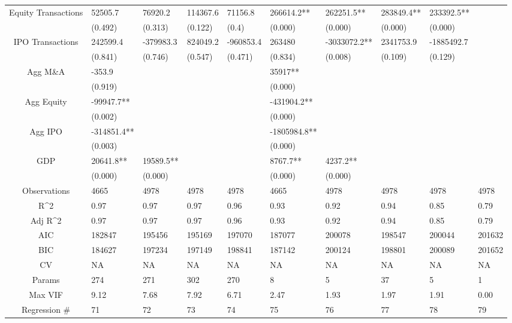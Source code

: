 \documentclass{article}
\begin{document}
\begin{table}[H]
\begin{tabular}{|clllllllll|}
  Equity Transactions & 52505.7 & 76920.2 & 114367.6 & 71156.8 & 266614.2** & 262251.5** & 283849.4** & 233392.5** &  \\ 
   & (0.492) & (0.313) & (0.122) & (0.4) & (0.000) & (0.000) & (0.000) & (0.000) &  \\ 
  IPO Transactions & 242599.4 & -379983.3 & 824049.2 & -960853.4 & 263480 & -3033072.2** & 2341753.9 & -1885492.7 &  \\ 
   & (0.841) & (0.746) & (0.547) & (0.471) & (0.834) & (0.008) & (0.109) & (0.129) &  \\ 
  Agg M\&A & -353.9 &  &  &  & 35917** &  &  &  &  \\ 
   & (0.919) &  &  &  & (0.000) &  &  &  &  \\ 
  Agg Equity & -99947.7** &  &  &  & -431904.2** &  &  &  &  \\ 
   & (0.002) &  &  &  & (0.000) &  &  &  &  \\ 
  Agg IPO & -314851.4** &  &  &  & -1805984.8** &  &  &  &  \\ 
   & (0.003) &  &  &  & (0.000) &  &  &  &  \\ 
  GDP & 20641.8** & 19589.5** &  &  & 8767.7** & 4237.2** &  &  &  \\ 
   & (0.000) & (0.000) &  &  & (0.000) & (0.000) &  &  &  \\ 
  \hline 
 Observations & 4665 & 4978 & 4978 & 4978 & 4665 & 4978 & 4978 & 4978 & 4978 \\ 
  R^2 & 0.97 & 0.97 & 0.97 & 0.96 & 0.93 & 0.92 & 0.94 & 0.85 & 0.79 \\ 
  Adj R^2 & 0.97 & 0.97 & 0.97 & 0.96 & 0.93 & 0.92 & 0.94 & 0.85 & 0.79 \\ 
  AIC & 182847 & 195456 & 195169 & 197070 & 187077 & 200078 & 198547 & 200044 & 201632 \\ 
  BIC & 184627 & 197234 & 197149 & 198841 & 187142 & 200124 & 198801 & 200089 & 201652 \\ 
  CV & NA & NA & NA & NA & NA & NA & NA & NA & NA \\ 
  Params & 274 & 271 & 302 & 270 & 8 & 5 & 37 & 5 & 1 \\ 
  Max VIF & 9.12 & 7.68 & 7.92 & 6.71 & 2.47 & 1.93 & 1.97 & 1.91 & 0.00 \\ 
  Regression \# & 71 & 72 & 73 & 74 & 75 & 76 & 77 & 78 & 79 \\ 
   \hline
\end{tabular}
 
\end{table}
\end{document}
